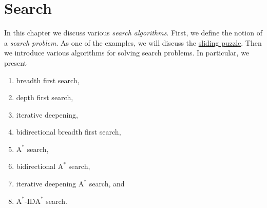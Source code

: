 \chapter{Search}
In this chapter we discuss various \emph{\color{blue}search algorithms}.  First, we define
the notion of a \emph{\color{blue}search problem}.  As one of the examples, we will discuss the
\href{https://en.wikipedia.org/wiki/15_puzzle}{sliding puzzle}.  Then we 
introduce various algorithms for solving search problems.  In particular, we present
\begin{enumerate}
\item breadth first search,
\item depth first search,
\item iterative deepening,
\item bidirectional breadth first search,
\item $\mathrm{A}^*$ search, 
\item bidirectional $\mathrm{A}^*$ search,
\item iterative deepening $\mathrm{A}^*$ search, and
\item $\mathrm{A}^*$-$\mathrm{IDA}^*$ search.
\end{enumerate}

